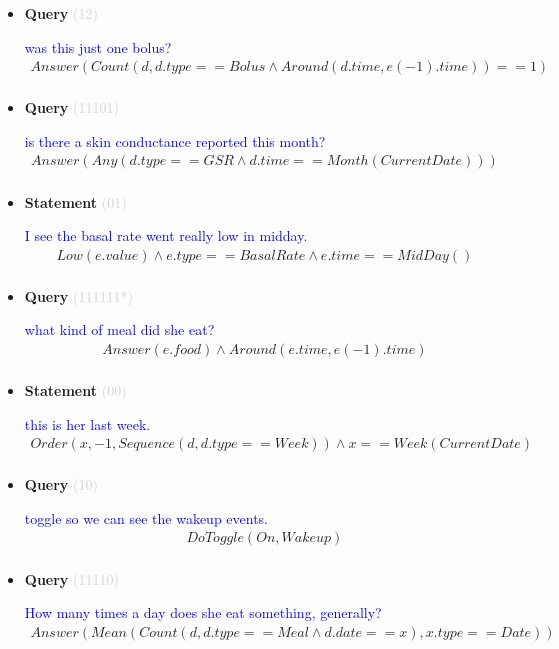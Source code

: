 \documentclass[11pt]{article}
\newcommand{\key}[1]{\textcolor{lightgray}{#1}}
\newcounter{CQuery}
\newcounter{CStatement}
\begin{document}
\begin{itemize}
\item
\textbf{Query\theCQuery} \key{(12)} \addtocounter{CQuery}{1}
\textcolor{blue}{ was this just one bolus? }
\begin{multline*}
Answer(Count(d, d.type==Bolus \wedge Around(d.time, e(-1).time))==1) \\ 
\end{multline*}


\item
\textbf{Query\theCQuery} \key{(11101)} \addtocounter{CQuery}{1}
\textcolor{blue}{ is there a skin conductance reported this month? }
\begin{multline*}
Answer(Any(d.type==GSR \wedge d.time==Month(CurrentDate))) \\ 
\end{multline*}


\item
\textbf{Statement\theCStatement} \key{(01)} \addtocounter{CStatement}{1}
\textcolor{blue}{ I see the basal rate went really low in midday. }
\begin{multline*}
Low(e.value) \wedge e.type==BasalRate \wedge e.time==MidDay() \\ 
\end{multline*}


\item
\textbf{Query\theCQuery} \key{(111111*)} \addtocounter{CQuery}{1}
\textcolor{blue}{ what kind of meal did she eat? }
\begin{multline*}
Answer(e.food) \wedge Around(e.time, e(-1).time) \\ 
\end{multline*}


\item
\textbf{Statement\theCStatement} \key{(00)} \addtocounter{CStatement}{1}
\textcolor{blue}{ this is her last week. }
\begin{multline*}
Order(x, -1, Sequence(d, d.type==Week)) \wedge x==Week(CurrentDate) \\ 
\end{multline*}


\item
\textbf{Query\theCQuery} \key{(10)} \addtocounter{CQuery}{1}
\textcolor{blue}{ toggle so we can see the wakeup events. }
\begin{multline*}
DoToggle(On, Wakeup) \\ 
\end{multline*}


\item
\textbf{Query\theCQuery} \key{(11110)} \addtocounter{CQuery}{1}
\textcolor{blue}{ How many times a day does she eat something, generally? }
\begin{multline*}
Answer(Mean(Count(d, d.type==Meal \wedge d.date==x), x.type==Date)) \\ 
\end{multline*}



\end{itemize}
\end{document}
